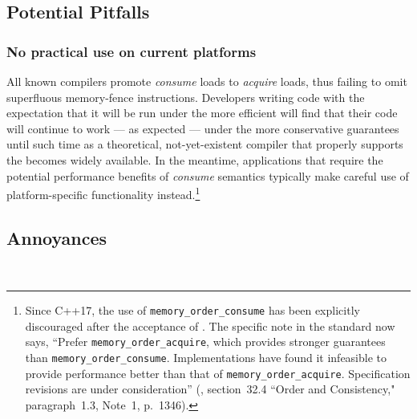 \subsection[Potential Pitfalls]{Potential Pitfalls}\label{potential-pitfalls}

\subsubsection[No practical use on current platforms]{No practical use on current platforms}\label{no-practical-use-on-current-platforms}

All known compilers promote \emph{consume} loads to \emph{acquire}
loads, thus failing to omit superfluous memory-fence instructions.
Developers writing code with the expectation that it will be run under
the more efficient   will find that their code will continue to work --- as
expected --- under the more conservative 
guarantees until such time as a theoretical, not-yet-existent compiler
that properly supports the 
 becomes widely available. In the
meantime, applications that require the potential performance benefits
of \emph{consume} semantics typically make careful use of platform-specific functionality instead.{\cprotect\footnote{Since C++17, the
use of \lstinline!memory_order_consume! has been explicitly
  discouraged after the acceptance of \cite{boehm16}. The specific
  note in the standard now says, ``Prefer
  \lstinline!memory_order_acquire!, which provides stronger guarantees
  than \lstinline!memory_order_consume!. Implementations have found it infeasible to provide performance better
  than that of \lstinline!memory_order_acquire!. Specification revisions
  are under consideration'' (\cite{iso17}, section~32.4 ``Order and Consistency," paragraph~1.3, Note~1, p.~1346). }}

\subsection[Annoyances]{Annoyances}\label{annoyances}

\hspace*{\fill}\\


